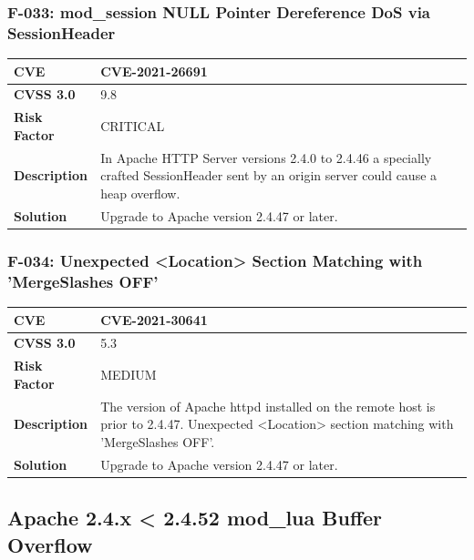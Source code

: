 \subsubsection{F-033: mod\_session NULL Pointer Dereference DoS via SessionHeader}
\begin{tabular}{|p{2.8cm}|p{12.2cm}|}
\hline
\textbf{CVE} & CVE-2021-26691 \\ \hline
\textbf{CVSS 3.0} & 9.8 \\ \hline
\textbf{Risk Factor} & CRITICAL \\ \hline
\textbf{Description} & In Apache HTTP Server versions 2.4.0 to 2.4.46 a specially crafted SessionHeader sent by an origin server could cause a heap overflow. \\ \hline
\textbf{Solution} & Upgrade to Apache version 2.4.47 or later. \\ \hline
\end{tabular}

\subsubsection{F-034: Unexpected <Location> Section Matching with 'MergeSlashes OFF'}
\begin{tabular}{|p{2.8cm}|p{12.2cm}|}
\hline
\textbf{CVE} & CVE-2021-30641 \\ \hline
\textbf{CVSS 3.0} & 5.3 \\ \hline
\textbf{Risk Factor} & MEDIUM \\ \hline
\textbf{Description} & The version of Apache httpd installed on the remote host is prior to 2.4.47. Unexpected <Location> section matching with 'MergeSlashes OFF'. \\ \hline
\textbf{Solution} & Upgrade to Apache version 2.4.47 or later. \\ \hline
\end{tabular}

%
%
\subsection{Apache 2.4.x < 2.4.52 mod\_lua Buffer Overflow}


